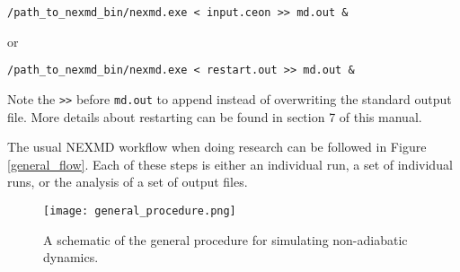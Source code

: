 \vspace{0.5cm}
\verb+/path_to_nexmd_bin/nexmd.exe < input.ceon >> md.out &+
\vspace{0.5cm}

or

\vspace{0.5cm}
\verb+/path_to_nexmd_bin/nexmd.exe < restart.out >> md.out &+
\vspace{0.5cm}

Note the \verb+>>+ before \verb+md.out+ to append instead of overwriting the standard output file. More details about restarting can be found in section 7 of this manual.

The usual NEXMD workflow when doing research can be followed in Figure \ref{general_flow}. Each of these steps is either an individual run, a set of individual runs, or the analysis of a set of output files.

\begin{figure}[ht]
	\centering
	\texttt{[image: general\_procedure.png]}
	\caption{\small A schematic of the general procedure for simulating non-adiabatic dynamics.}\label{general_flow}
\label{genproc}
\end{figure}